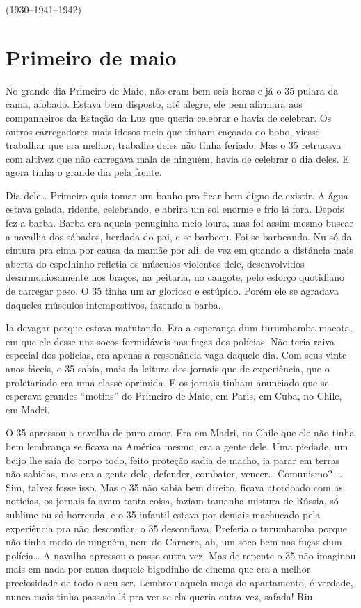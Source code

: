 \bigskip

\hfill{}(1930--1941--1942)

\chapter{Primeiro de maio}

No grande dia Primeiro de Maio, não eram bem seis horas e já o 35 pulara
da cama, afobado. Estava bem disposto, até alegre, ele bem afirmara aos
companheiros da Estação da Luz que queria celebrar e havia de celebrar.
Os outros carregadores mais idosos meio que tinham caçoado do bobo,
viesse trabalhar que era melhor, trabalho deles não tinha feriado. Mas o
35 retrucava com altivez que não carregava mala de ninguém, havia de
celebrar o dia deles. E agora tinha o grande dia pela frente.

Dia dele\ldots{} Primeiro quis tomar um banho pra ficar bem digno de existir.
A água estava gelada, ridente, celebrando, e abrira um sol enorme e frio
lá fora. Depois fez a barba. Barba era aquela penuginha meio loura, mas
foi assim mesmo buscar a navalha dos sábados, herdada do pai, e se
barbeou. Foi se barbeando. Nu só da cintura pra cima por causa da mamãe
por ali, de vez em quando a distância mais aberta do espelhinho refletia
os músculos violentos dele, desenvolvidos desarmoniosamente nos braços,
na peitaria, no cangote, pelo esforço quotidiano de carregar peso. O 35
tinha um ar glorioso e estúpido. Porém ele se agradava daqueles músculos
intempestivos, fazendo a barba.

Ia devagar porque estava matutando. Era a esperança dum turumbamba
macota, em que ele desse uns socos formidáveis nas fuças dos polícias.
Não teria raiva especial dos polícias, era apenas a ressonância vaga
daquele dia. Com seus vinte anos fáceis, o 35 sabia, mais da leitura dos
jornais que de experiência, que o proletariado era uma classe oprimida.
E os jornais tinham anunciado que se esperava grandes ``motins'' do
Primeiro de Maio, em Paris, em Cuba, no Chile, em Madri.

O 35 apressou a navalha de puro amor. Era em Madri, no Chile que ele não
tinha bem lembrança se ficava na América mesmo, era a gente dele. Uma
piedade, um beijo lhe saía do corpo todo, feito proteção sadia de macho,
ia parar em terras não sabidas, mas era a gente dele, defender,
combater, vencer\ldots{} Comunismo? \ldots{} Sim, talvez fosse isso. Mas o 35 não
sabia bem direito, ficava atordoado com as notícias, os jornais falavam
tanta coisa, faziam tamanha mistura de Rússia, só sublime ou só
horrenda, e o 35 infantil estava por demais machucado pela experiência
pra não desconfiar, o 35 desconfiava. Preferia o turumbamba porque não
tinha medo de ninguém, nem do Carnera, ah, um soco bem nas fuças dum
polícia\ldots{} A navalha apressou o passo outra vez. Mas de repente o 35 não
imaginou mais em nada por causa daquele bigodinho de cinema que era a
melhor preciosidade de todo o seu ser. Lembrou aquela moça do
apartamento, é verdade, nunca mais tinha passado lá pra ver se ela
queria outra vez, safada! Riu.

